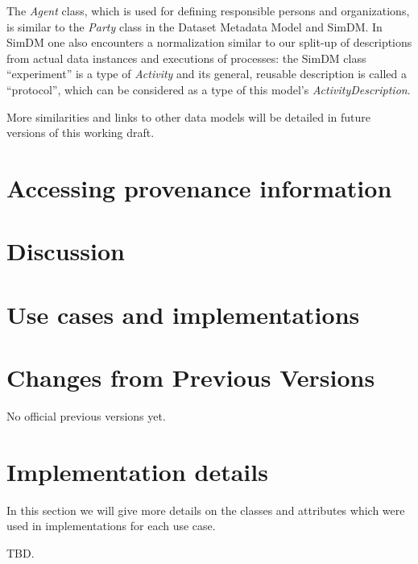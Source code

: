 \documentclass[11pt,a4paper]{ivoa}
\newcommand{\class}[1]{\emph{#1}}
\begin{document}
The \class{Agent} class, which is used for defining responsible persons and 
organizations, is similar to the \class{Party} class in the Dataset Metadata Model and SimDM.
In SimDM one also encounters a normalization similar to our split-up of descriptions from 
actual data instances and executions of processes: the SimDM class ``experiment'' 
is a type of \class{Activity} and its general, reusable description is called a ``protocol'',
which can be considered as a type of this model's \class{ActivityDescription}.

More similarities and links to other data models will be detailed in future 
versions of this working draft.


\section{Accessing provenance information}


\section{Discussion}


\section{Use cases and implementations}\label{sec:usecases-implementations}



\appendix
\section{Changes from Previous Versions}
No official previous versions yet.

\section{Implementation details}\label{sec:implementation-details}
In this section we will give more details on the classes and attributes which were used 
in implementations for each use case.

TBD.



\end{document}

